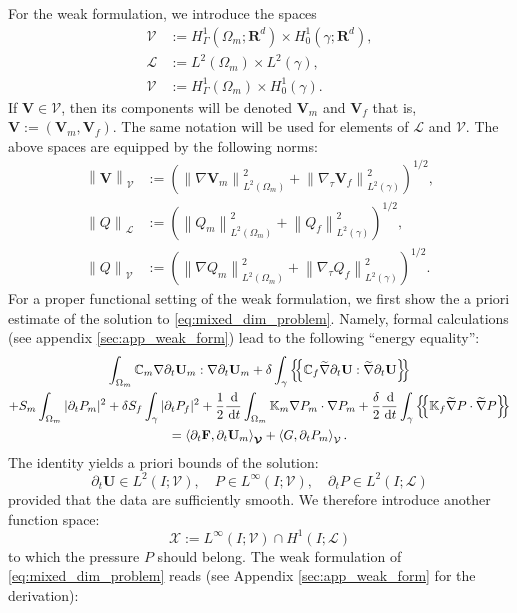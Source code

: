 \documentclass[a4paper]{article}
\numberwithin{equation}{section}
\def\agrad{\widetilde\nabla}
\def\avg#1{\left\{\mskip-5mu\left\{#1\right\}\mskip-5mu\right\}}
\def\CC{\tn C}
\def\d {\,{\rm d}}
\def\ddt#1{\frac{\d #1}{\d t}}
\def\dt{\prtl_t}
\def\dual#1#2{\left\langle #1,#2\right\rangle}
\def\FF{\vc F}
\def\Hf{\mathscr{L}} %
\def\norm#1{\left\|#1\right\|}
\def\prtl{\partial}
\def\Real{{\mathbf R}} %
\def\tn#1{{\mathbb{#1}}}    %
\def\U{\vc U}
\def\V{\vc V}
\def\Vel{{\boldsymbol{\mathcal V}}} %
\def\Vf{{\mathcal V}} %
\def\vc#1{\mathbf{#1}}     %
\newcommand{\eqs}[1]{\begin{equation*}#1\end{equation*}}
\newcommand{\ml}[1]{\begin{multline}#1\end{multline}}
\begin{document}
For the weak formulation, we introduce the spaces
\begin{align*}
\Vel &:= H^1_\Gamma(\Omega_m;\Real^d)\times H^1_0(\gamma;\Real^d),\\
\Hf &:= L^2(\Omega_m)\times L^2(\gamma),\\
\Vf &:= H^1_\Gamma(\Omega_m)\times H^1_0(\gamma).
\end{align*}
If $\V\in\Vel$, then its components will be denoted $\V_m$ and $\V_f$ that is, $\V:=(\V_m,\V_f)$.
The same notation will be used for elements of $\Hf$ and $\Vf$.
The above spaces are equipped by the following norms:
\begin{align*}
\norm{\V}_\Vel &:= (\norm{\nabla\V_m}_{L^2(\Omega_m)}^2 + \norm{\nabla_\tau\V_f}_{L^2(\gamma)}^2)^{1/2},\\
\norm{Q}_\Hf &:= (\norm{Q_m}_{L^2(\Omega_m)}^2 + \norm{Q_f}_{L^2(\gamma)}^2)^{1/2},\\
\norm{Q}_\Vf &:= (\norm{\nabla Q_m}_{L^2(\Omega_m)}^2 + \norm{\nabla_\tau Q_f}_{L^2(\gamma)}^2)^{1/2}.
\end{align*}
For a proper functional setting of the weak formulation, we first show the a priori estimate of the solution to \eqref{eq:mixed_dim_problem}.
Namely, formal calculations (see appendix \ref{sec:app_weak_form}) lead to the following ``energy equality'':
\ml{ \label{eq:apriori_biot} \int_{\Omega_m}\CC_m\nabla\dt\U_m:\nabla\dt\U_m + \delta\int_\gamma\avg{\CC_f\agrad\dt\U:\agrad\dt\U}\\
+ S_m\int_{\Omega_m}|\dt P_m|^2 + \delta S_f\int_\gamma|\dt P_f|^2
+ \frac12\ddt{}\int_{\Omega_m}\tn K_m\nabla P_m\cdot\nabla P_m
+ \frac\delta2\ddt{}\int_\gamma\avg{\tn K_f\agrad P\cdot\agrad P}\\
= \dual{\dt\FF}{\dt{\U_m}}_{\Vel} + \dual{G}{\dt P_m}_{\Vf}. }
The identity yields a priori bounds of the solution:
\eqs{ \dt\U\in L^2(I;\Vel),\quad P\in L^\infty(I;\Vf),\quad \dt P\in L^2(I;\Hf) }
provided that the data are sufficiently smooth.
% 
We therefore introduce another function space:
\eqs{ \mathcal X := L^\infty( I;\Vf)\cap H^1( I;\Hf) }
to which the pressure $P$ should belong.
The weak formulation of \eqref{eq:mixed_dim_problem} reads (see Appendix \ref{sec:app_weak_form} for the derivation):
\end{document}

